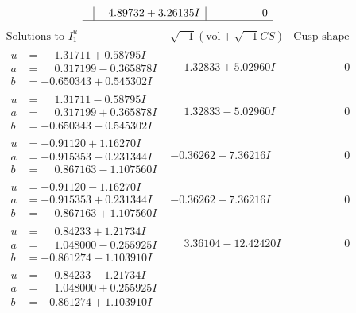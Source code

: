 \documentclass[1p]{elsarticle_modified}
\theoremstyle{definition}
\newcommand{\I}{\sqrt{-1}}
\begin{document}
$$\begin{array}{c|c|c}
 & \phantom{-}4.89732 + 3.26135 I & \phantom{-0.000000 } 0\\
 \hline 
 \end{array}$$\newpage$$\begin{array}{c|c|c}  
\text{Solutions to }I^u_{1}& \I (\text{vol} + \sqrt{-1}CS) & \text{Cusp shape}\\
 \hline 
\begin{aligned}
u &= \phantom{-}1.31711 + 0.58795 I \\
a &= \phantom{-}0.317199 - 0.365878 I \\
b &= -0.650343 + 0.545302 I\end{aligned}
 & \phantom{-}1.32833 + 5.02960 I & \phantom{-0.000000 } 0 \\ \hline\begin{aligned}
u &= \phantom{-}1.31711 - 0.58795 I \\
a &= \phantom{-}0.317199 + 0.365878 I \\
b &= -0.650343 - 0.545302 I\end{aligned}
 & \phantom{-}1.32833 - 5.02960 I & \phantom{-0.000000 } 0 \\ \hline\begin{aligned}
u &= -0.91120 + 1.16270 I \\
a &= -0.915353 - 0.231344 I \\
b &= \phantom{-}0.867163 - 1.107560 I\end{aligned}
 & -0.36262 + 7.36216 I & \phantom{-0.000000 } 0 \\ \hline\begin{aligned}
u &= -0.91120 - 1.16270 I \\
a &= -0.915353 + 0.231344 I \\
b &= \phantom{-}0.867163 + 1.107560 I\end{aligned}
 & -0.36262 - 7.36216 I & \phantom{-0.000000 } 0 \\ \hline\begin{aligned}
u &= \phantom{-}0.84233 + 1.21734 I \\
a &= \phantom{-}1.048000 - 0.255925 I \\
b &= -0.861274 - 1.103910 I\end{aligned}
 & \phantom{-}3.36104 - 12.42420 I & \phantom{-0.000000 } 0 \\ \hline\begin{aligned}
u &= \phantom{-}0.84233 - 1.21734 I \\
a &= \phantom{-}1.048000 + 0.255925 I \\
b &= -0.861274 + 1.103910 I\end{aligned}

\end{array}$$
\end{document}
